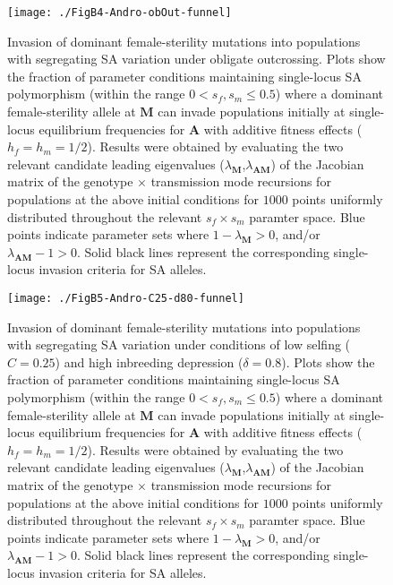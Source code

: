 \documentclass{article}
\begin{document}
\begin{figure}[ht!]
\centering
\texttt{[image: ./FigB4-Andro-obOut-funnel]}
\caption{Invasion of dominant female-sterility mutations into populations with segregating SA variation under obligate outcrossing. Plots show the fraction of parameter conditions maintaining single-locus SA polymorphism (within the range $0 < s_f,s_m \leq 0.5$) where a dominant female-sterility allele at $\mathbf{M}$ can invade populations initially at single-locus equilibrium frequencies for $\mathbf{A}$ with additive fitness effects ($h_f=h_m=1/2$). Results were obtained by evaluating the two relevant candidate leading eigenvalues ($\lambda_{\mathbf{M}}$,$\lambda_{\mathbf{AM}}$) of the Jacobian matrix of the genotype $\times$ transmission mode recursions for populations at the above initial conditions for $1000$ points uniformly distributed throughout the relevant $s_f \times s_m$ paramter space. Blue points indicate parameter sets where $1 - \lambda_{\mathbf{M}} > 0$, and/or $\lambda_{\mathbf{AM}} - 1 > 0$. Solid black lines represent the corresponding single-locus invasion criteria for SA alleles.}
\label{fig:AndroObOutFunnel}
\end{figure}
\newpage{}

\begin{figure}[ht!]
\centering
\texttt{[image: ./FigB5-Andro-C25-d80-funnel]}
\caption{Invasion of dominant female-sterility mutations into populations with segregating SA variation under conditions of low selfing ($C = 0.25$) and high inbreeding depression ($\delta = 0.8$). Plots show the fraction of parameter conditions maintaining single-locus SA polymorphism (within the range $0 < s_f,s_m \leq 0.5$) where a dominant female-sterility allele at $\mathbf{M}$ can invade populations initially at single-locus equilibrium frequencies for $\mathbf{A}$ with additive fitness effects ($h_f=h_m=1/2$). Results were obtained by evaluating the two relevant candidate leading eigenvalues ($\lambda_{\mathbf{M}}$,$\lambda_{\mathbf{AM}}$) of the Jacobian matrix of the genotype $\times$ transmission mode recursions for populations at the above initial conditions for $1000$ points uniformly distributed throughout the relevant $s_f \times s_m$ paramter space. Blue points indicate parameter sets where $1 - \lambda_{\mathbf{M}} > 0$, and/or $\lambda_{\mathbf{AM}} - 1 > 0$. Solid black lines represent the corresponding single-locus invasion criteria for SA alleles.}
\label{fig:AndC25d80Funnel}
\end{figure}
\newpage{}
\end{document}
